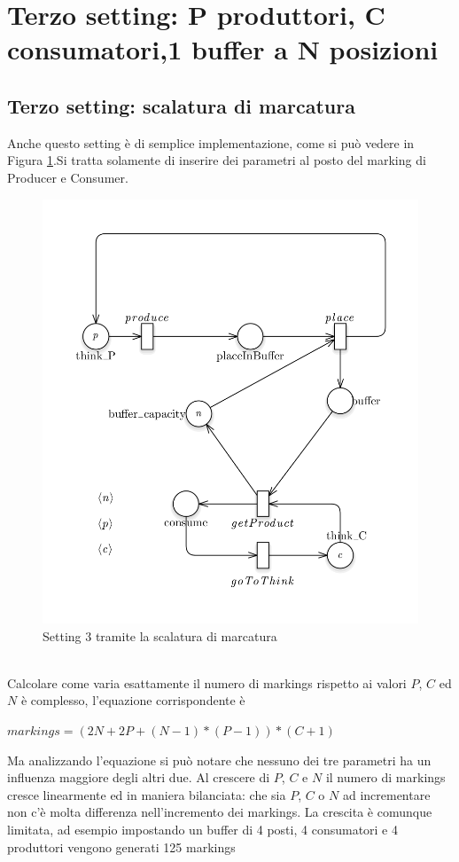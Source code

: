 \documentclass{article}
\begin{document}
\newpage
\section{Terzo  setting: P produttori, C consumatori,1 buffer a N posizioni}\label{SEC:terzo}
\subsection{Terzo  setting: scalatura di marcatura}\label{SEC:terzo-marking}
Anche questo setting è di semplice implementazione, come si può vedere in Figura \ref{FIG:setting3_markdown}.Si tratta solamente di inserire dei parametri al posto del marking di Producer e Consumer.
\begin{figure}[!ht]
\centering
\includegraphics[width=\textwidth]{./Esercizio2_img/setting3_markdown.png}
\caption{Setting 3 tramite la scalatura di marcatura} \label{FIG:setting3_markdown}
\end{figure}\\
Calcolare come varia esattamente il numero di markings rispetto ai valori $P$, $C$ ed $N$ è complesso, l'equazione corrispondente è\begin{center}$markings = (2N + 2P + (N-1) * (P-1)) * (C+1)$\end{center}
Ma analizzando l'equazione si può notare che nessuno dei tre parametri ha un influenza maggiore degli altri due.
Al crescere di $P$, $C$ e $N$ il numero di markings cresce linearmente ed in maniera bilanciata: che sia $P$, $C$ o $N$ ad incrementare non c'è molta differenza nell'incremento dei markings.
La crescita è comunque limitata, ad esempio impostando un buffer di 4 posti, 4 consumatori e 4 produttori vengono generati 125 markings
\newpage
\end{document}

